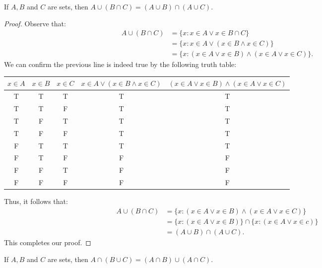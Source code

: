 \documentclass{exam}
\begin{document}
\begin{proposition}{8.8}
    If $A, B$ and $C$ are sets, then $A\cup(B\cap C)=(A\cup B)\cap(A\cup C)$.
\end{proposition}

\begin{proof}
    Observe that:
    \begin{align*}
        A\cup (B\cap C) &= \{x:x\in A \lor x \in B\cap C\}\\
        &=\{x:x\in A\lor(x\in B \land x\in C)\}\\
        &=\{x:(x\in A\lor x\in B) \land (x\in A \lor x \in C)\}.
    \end{align*}
    We can confirm the previous line is indeed true by the following truth table:
    \begin{center}
        \begin{tabular}{|c|c|c||c||c|}
            \hline
            $x\in A$ & $x\in B$ & $x\in C$ & $x\in A\lor(x\in B\land x\in C)$ & $(x\in A\lor x\in B)\land(x\in A\lor x\in C)$\\
            \hline\hline
            T&T&T&T&T\\
            \hline
            T&T&F&T&T\\
            \hline
            T&F&T&T&T\\
            \hline
            T&F&F&T&T\\
            \hline
            F&T&T&T&T\\
            \hline
            F&T&F&F&F\\
            \hline
            F&F&T&F&F\\
            \hline
            F&F&F&F&F\\
            \hline
        \end{tabular}
    \end{center}
    Thus, it follows that:
    \begin{align*}
        A\cup (B\cap C) &=\{x:(x\in A\lor x\in B) \land (x\in A \lor x \in C)\}\\
        &=\{x:(x\in A\lor x\in B)\}\cap\{x:(x\in A\lor x\in c)\}\\
        &=(A\cup B)\cap(A\cup C).
    \end{align*}
    This completes our proof.
\end{proof}

\begin{proposition}{8.9}
    If $A,B$ and $C$ are sets, then $A\cap (B\cup C)=(A\cap B)\cup(A\cap C)$.
\end{proposition}
\end{document}
